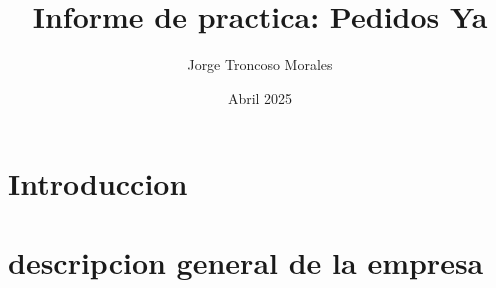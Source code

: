 \documentclass[pdftex,spanish]{pucthesis}	%
\begin{document}


\title[Informe de practica: Pedidos Ya]
{\bf Informe de practica: Pedidos Ya}
\author[Jorge Troncoso Morales]{Jorge Troncoso Morales}

\address                    {}

\subject                    {Structural Engineering}
\date                       {Abril 2025}


\NoChapterPageNumber
{}
\maketitle




\tableofcontents
\cleardoublepage


\chapter[INTRODUCCION]{Introduccion}


\chapter[DESCRIPCION GENERAL DE LA EMPRESA]{descripcion general de la empresa}

\end{document}
